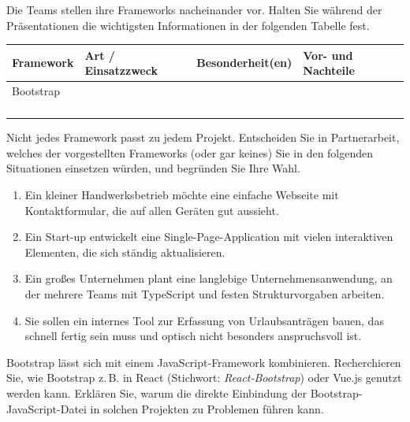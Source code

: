 \documentclass[11pt, a4paper, oneside]{article}
\begin{document}
	\pagebreak


	Die Teams stellen ihre Frameworks nacheinander vor.
	Halten Sie während der Präsentationen die wichtigsten Informationen in der folgenden Tabelle fest.

	\begin{center}
		\begin{tabular}{|p{2.8cm}|p{3.2cm}|p{3.2cm}|p{4.2cm}|}
			\hline
			\textbf{Framework} & \textbf{Art / Einsatzzweck} & \textbf{Besonderheit(en)} & \textbf{Vor- und Nachteile} \\
			\hline
			\hline
			Bootstrap\vspace{2.5cm} & & & \\
			\hline
			\phantom{x}\vspace{2.5cm} & & & \\
			\hline
			\phantom{x}\vspace{2.5cm} & & & \\
			\hline
			\phantom{x}\vspace{2.5cm} & & & \\
			\hline
			\phantom{x}\vspace{2.5cm} & & & \\
			\hline
		\end{tabular}
	\end{center}


	\pagebreak


	Nicht jedes Framework passt zu jedem Projekt.
	Entscheiden Sie in Partnerarbeit, welches der vorgestellten Frameworks (oder gar keines) Sie in den folgenden Situationen einsetzen würden, und begründen Sie Ihre Wahl.

	\begin{enumerate}[label=\alph*)]
		\item Ein kleiner Handwerksbetrieb möchte eine einfache Webseite mit Kontaktformular, die auf allen Geräten gut aussieht.
		\item Ein Start-up entwickelt eine Single-Page-Application mit vielen interaktiven Elementen, die sich ständig aktualisieren.
		\item Ein großes Unternehmen plant eine langlebige Unternehmensanwendung, an der mehrere Teams mit TypeScript und festen Strukturvorgaben arbeiten.
		\item Sie sollen ein internes Tool zur Erfassung von Urlaubsanträgen bauen, das schnell fertig sein muss und optisch nicht besonders anspruchsvoll ist.
	\end{enumerate}

	\lines[7cm]



	Bootstrap lässt sich mit einem JavaScript-Framework kombinieren.
	Recherchieren Sie, wie Bootstrap z.\,B. in React (Stichwort: \emph{React-Bootstrap}) oder Vue.js genutzt werden kann.
	Erklären Sie, warum die direkte Einbindung der Bootstrap-JavaScript-Datei in solchen Projekten zu Problemen führen kann.
\end{document}
